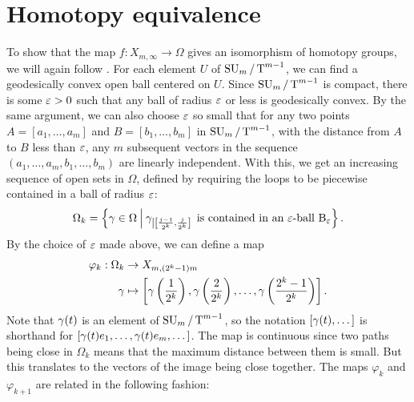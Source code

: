 \section{Homotopy equivalence}

To show that the map $f : X_{m,\infty} \to \Omega$
gives an isomorphism of homotopy groups, we will again follow
\cite{milnor}. For each element $U$ of $\operatorname{SU}_{m}/\operatorname{T}^{m-1}$, we can find a 
geodesically convex open ball centered on $U$. Since $\operatorname{SU}_{m}/\operatorname{T}^{m-1}$
is compact, there is some $\varepsilon > 0$ such that any ball of radius $\varepsilon$
or less is geodesically convex. By the same argument, we can also
choose $\varepsilon$ so small that for any two points $A= [a_1,\dots, a_m]$ and
$B=[b_1,\dots,b_m]$ in $\operatorname{SU}_{m}/\operatorname{T}^{m-1}$, with the distance from $A$ to $B$ less
than $\varepsilon$, any $m$ subsequent vectors in the sequence
$(a_1,\dots,a_m,b_1,\dots,b_m)$ are linearly
independent. 
With this, we get an increasing sequence of open sets in $\Omega$,
defined by requiring the loops to be piecewise contained in a ball of
radius $\varepsilon$:
\[ \Omega_k = \left\{ \gamma \in \Omega \: \Big\vert\:
  \gamma_{\left|\left[ \frac{j-1}{2^k},\frac{j}{2^k} \right]\right.} \text{ is
  contained in an $\varepsilon$-ball $\mathrm{B}_\varepsilon$}  \right\}. \]
By the choice of $\varepsilon$ made above, we can define a map
\begin{align*}
  \varphi_k : \Omega_k &\to X_{m,(2^k-1)m} \\
  \gamma &\mapsto \left[ \gamma\left(\frac{1}{2^k}\right),
    \gamma\left(\frac{2}{2^k}\right), \dots,
    \gamma\left(\frac{2^k-1}{2^k}\right) \right].
\end{align*}
Note that $\gamma(t)$ is an element of $\operatorname{SU}_{m}/\operatorname{T}^{m-1}$, so the notation
$[\gamma(t),\dots]$ is shorthand for $[\gamma(t)e_1,\dots,\gamma(t)e_m,\dots]$.
The map is continuous since two paths being close in $\Omega_k$ means
that the maximum distance between them is small. But this translates
to the vectors of the image being close together. The maps $\varphi_k$
and $\varphi_{k+1}$ are related in the following fashion:

